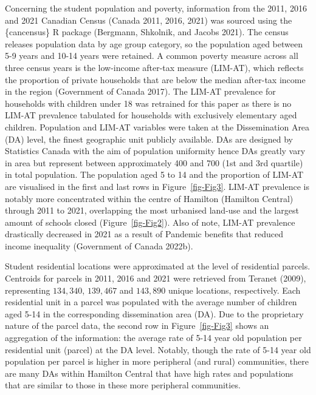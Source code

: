 \documentclass[
default
]{sn-jnl}
\begin{document}
Concerning the student population and poverty, information from the
2011, 2016 and 2021 Canadian Census (Canada 2011, 2016, 2021) was
sourced using the \{cancensus\} R package (Bergmann, Shkolnik, and
Jacobs 2021). The census releases population data by age group category,
so the population aged between 5-9 years and 10-14 years were retained.
A common poverty measure across all three census years is the low-income
after-tax measure (LIM-AT), which reflects the proportion of private
households that are below the median after-tax income in the region
(Government of Canada 2017). The LIM-AT prevalence for households with
children under 18 was retrained for this paper as there is no LIM-AT
prevalence tabulated for households with exclusively elementary aged
children. Population and LIM-AT variables were taken at the
Dissemination Area (DA) level, the finest geographic unit publicly
available. DAs are designed by Statistics Canada with the aim of
population uniformity hence DAs greatly vary in area but represent
between approximately 400 and 700 (1st and 3rd quartile) in total
population. The population aged 5 to 14 and the proportion of LIM-AT are
visualised in the first and last rows in Figure~\ref{fig-Fig3}. LIM-AT
prevalence is notably more concentrated within the centre of Hamilton
(Hamilton Central) through 2011 to 2021, overlapping the most urbanised
land-use and the largest amount of schools closed
(Figure~\ref{fig-Fig2}). Also of note, LIM-AT prevalence drastically
decreased in 2021 as a result of Pandemic benefits that reduced income
inequality (Government of Canada 2022b).

Student residential locations were approximated at the level of
residential parcels. Centroids for parcels in 2011, 2016 and 2021 were
retrieved from Teranet (2009), representing \(134,340\), \(139,467\) and
\(143,890\) unique locations, respectively. Each residential unit in a
parcel was populated with the average number of children aged 5-14 in
the corresponding dissemination area (DA). Due to the proprietary nature
of the parcel data, the second row in Figure~\ref{fig-Fig3} shows an
aggregation of the information: the average rate of 5-14 year old
population per residential unit (parcel) at the DA level. Notably,
though the rate of 5-14 year old population per parcel is higher in more
peripheral (and rural) communities, there are many DAs within Hamilton
Central that have high rates and populations that are similar to those
in these more peripheral communities.
\end{document}
